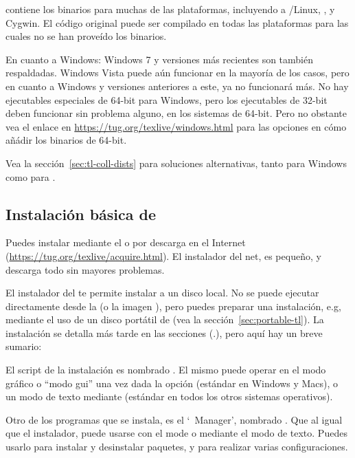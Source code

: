 \documentclass{article}
\begin{document}
\TL{} contiene los binarios para muchas de las plataformas, incluyendo
a \GNU/Linux, \MacOSX, y Cygwin. El código original puede ser
compilado en todas las plataformas para las cuales no se han proveído
los binarios.

En cuanto a Windows: Windows 7 y versiones más recientes
son también respaldadas. Windows Vista puede aún funcionar en la mayoría de los casos, pero en cuanto a Windows  y versiones anteriores a este, \TL{} ya no funcionará más. No hay
ejecutables especiales de 64-bit para Windows, pero los ejecutables de
32-bit deben funcionar sin problema alguno, en los sistemas de
64-bit. Pero no obstante vea el enlace en \url{https://tug.org/texlive/windows.html} para las opciones en cómo añádir los binarios de 64-bit.

Vea la sección~\ref{sec:tl-coll-dists} para soluciones alternativas,
tanto para Windows como para \MacOSX.

\subsection{Instalación básica de \protect\TL{}}
\label{sec:basic}

Puedes instalar \TL{} mediante el \DVD{} o por descarga en el Internet
(\url{https://tug.org/texlive/acquire.html}). El instalador del net, es
pequeño, y descarga todo sin mayores problemas. 

El instalador del \DVD{} te permite instalar a un disco local. No se
puede ejecutar directamente \TL{} desde la \TK{} \DVD{} (o la
imagen ), pero puedes preparar una instalación, e.g,
mediante el uso de un disco portátil de \USB{} (vea la
sección~\ref{sec:portable-tl}). La instalación se detalla más tarde en
las secciones (\p.\pageref{sec:install}), pero aquí hay un breve
sumario:

\begin{itemize*}

\item El script de la instalación es nombrado . El mismo
	puede operar en el modo gráfico o ``modo gui'' una vez dada la opción
		 (estándar en Windows y Macs), o un modo de texto
		mediante  (estándar en todos los otros sistemas
		operativos). 

\item Otro de los programas que se instala, es el `\TL\ Manager', nombrado
	. Que al igual que el instalador, puede usarse con el mode
		\GUI{} o mediante el modo de texto. Puedes usarlo para instalar
		y desinstalar paquetes, y para realizar varias configuraciones.

\end{itemize*}
\end{document}
